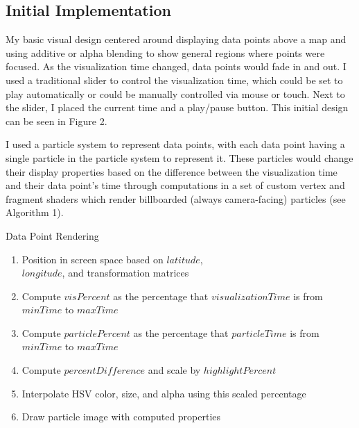 \documentclass[conference]{acmsiggraph}
\begin{document}
\subsection{Initial Implementation}

My basic visual design centered around displaying data points above a map and
using additive or alpha blending to show general regions where points were
focused. As the visualization time changed, data points would fade in and out.
I used a traditional slider to control the visualization time, which could be
set to play automatically or could be manually controlled via mouse or touch.
Next to the slider, I placed the current time and a play/pause button. This
initial design can be seen in Figure 2.

I used a particle system to represent data points, with each data point having
a single particle in the particle system to represent it. These particles would
change their display properties based on the difference between the
visualization time and their data point's time through computations in a set
of custom vertex and fragment shaders which render billboarded (always
camera-facing) particles (see Algorithm 1).

\begin{algorithm}
\DontPrintSemicolon
\caption{Data Point Rendering}
     {
        \begin{enumerate}
            \item Position in screen space based on $latitude$, \\
                $longitude$, and transformation matrices
            \item Compute $visPercent$ as the percentage that
                $visualizationTime$ is from $minTime$ to $maxTime$
            \item Compute $particlePercent$ as the percentage that
                $particleTime$ is from $minTime$ to $maxTime$
            \item Compute $percentDifference$ and scale by $highlightPercent$
            \item Interpolate HSV color, size, and alpha using this scaled
                percentage
            \item Draw particle image with computed properties
        \end{enumerate}
    }
\end{algorithm}
\end{document}
